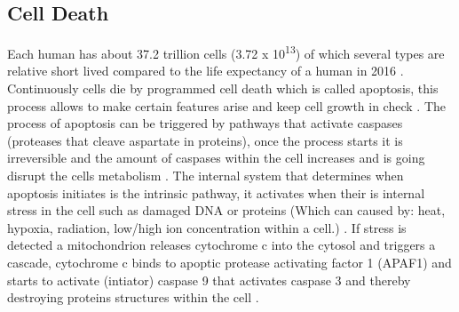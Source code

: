\subsection{Cell Death}
Each human has about 37.2 trillion cells (3.72 x 10\textsuperscript{13}) \cite{} of which several types are relative short lived \cite{} compared to the life expectancy of a human in 2016 \cite{}. 
Continuously cells die by programmed cell death which is called apoptosis, this process allows to make certain features arise and keep cell growth in check \cite{}.
The process of apoptosis can be triggered by pathways that activate caspases (proteases that cleave aspartate in proteins), once the process starts it is irreversible and the amount of caspases within the cell increases and is going disrupt the cells metabolism \cite{}.
The internal system that determines when apoptosis initiates is the intrinsic pathway, it activates when their is internal stress in the cell such as damaged DNA or proteins (Which can caused by: heat, hypoxia, radiation, low/high ion concentration within a cell.)  \cite{}. 
If stress is detected a mitochondrion releases cytochrome c into the cytosol and triggers a cascade, cytochrome c binds to apoptic protease activating factor 1 (APAF1) and starts to activate (intiator) caspase 9 that activates caspase 3 and thereby destroying proteins structures within the cell \cite{}. 



